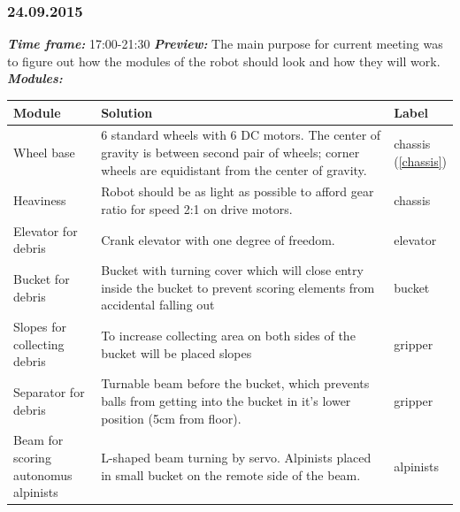 \subsubsection{24.09.2015}
	\textit{\textbf{Time frame:}} 17:00-21:30 \newline
	\textit{\textbf{Preview:}} The main purpose for current meeting was to figure out how the modules of the robot should look and how they will work. \newline \newline
	\textit{\textbf{Modules:}}

  \begin{table}[H]
	\vspace{-2mm}
	\begin{center}
		\begin{tabular}{|p{0.2\linewidth}|p{0.7\linewidth}|p{0.1\linewidth}|}
			\hline
			Module & Solution & Label \\
			\hline
			Wheel base & 6 standard wheels with 6 DC motors. The center of gravity is between second pair of wheels; corner wheels are equidistant from the center of gravity. & chassis (\ref{chassis}) \\
			\hline
			Heaviness & Robot should be as light as possible to afford gear ratio for speed 2:1 on drive motors. & chassis \\
			\hline
			Elevator for debris & Crank elevator with one degree of freedom. & elevator \\
			\hline
			Bucket for debris & Bucket with turning cover which will close entry inside the bucket to prevent scoring elements from accidental falling out & bucket \\
			\hline
			Slopes for collecting debris & To increase collecting area on both sides of the bucket will be placed slopes & gripper \\
			\hline
			Separator for debris & Turnable beam before the bucket, which prevents balls from getting into the bucket in it's lower position (5cm from floor). & gripper \\
			\hline
			Beam for scoring autonomus alpinists & L-shaped beam turning by servo. Alpinists placed in small bucket on the remote side of the beam. & alpinists \\
			\hline
		\end{tabular}
	\end{center}
  \end{table}
  
